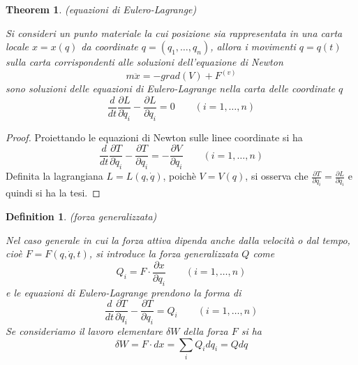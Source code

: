 \documentclass{article}
\newtheorem{theorem}{Theorem}[section]
\newtheorem{definition}{Definition}[section]
\begin{document}
            \begin{theorem}(equazioni di Eulero-Lagrange)
                \label{thm:equazioni di Eulero-Lagrange}

                Si consideri un punto materiale la cui posizione sia rappresentata in una carta locale $x = x(q)$ da coordinate $q = (q_1, \dots, q_n)$, allora
                i movimenti $q = q(t)$ sulla carta corrispondenti alle soluzioni dell'equazione di Newton \[ m \ddot{x} = - grad(V) + F^{(v)} \] sono soluzioni delle
                equazioni di Eulero-Lagrange nella carta delle coordinate $q$ \[ \frac{d}{dt} \frac{\partial L}{\partial \dot{q}_i} - \frac{\partial L}{\partial q_i} = 0 \quad \quad (i = 1, \dots, n) \]
                
            \end{theorem}
            \begin{proof}
                
                Proiettando le equazioni di Newton sulle linee coordinate si ha \[ \frac{d}{dt} \frac{\partial T}{\partial \dot{q}_i} - \frac{\partial T}{\partial q_i} = - \frac{\partial V}{\partial q_i} \quad \quad (i = 1, \dots, n) \]
                Definita la lagrangiana $L = L(q, \dot{q})$, poichè $V = V(q)$, si osserva che $\frac{\partial T}{\partial \dot{q}_i} = \frac{\partial L}{\partial \dot{q}_i}$ e quindi si ha la tesi.

            \end{proof}

            \begin{definition}(forza generalizzata)
                
                Nel caso generale in cui la forza attiva dipenda anche dalla velocità o dal tempo, cioè $F = F(q, \dot{q}, t)$, si introduce la forza generalizzata $Q$ come
                \[ Q_i = F \cdot \frac{\partial x}{\partial q_i} \quad \quad (i = 1, \dots, n) \] e le equazioni di Eulero-Lagrange prendono la forma di 
                \[ \frac{d}{dt} \frac{\partial T}{\partial \dot{q}_i} - \frac{\partial T}{\partial q_i} = Q_i \quad \quad (i = 1, \dots, n) \]
                Se consideriamo il lavoro elementare $\delta W$ della forza $F$ si ha \[ \delta W = F \cdot dx = \sum_i Q_i dq_i = Q dq \]
                
            \end{definition}
\end{document}
